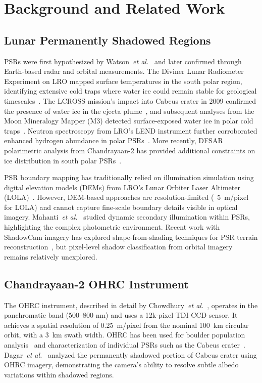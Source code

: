 \documentclass[journal]{IEEEtran}
\begin{document}
\section{Background and Related Work}
\label{sec:background}

\subsection{Lunar Permanently Shadowed Regions}

PSRs were first hypothesized by Watson~\textit{et al.}~\cite{Watson1961} and later confirmed through Earth-based radar and orbital measurements. The Diviner Lunar Radiometer Experiment on LRO mapped surface temperatures in the south polar region, identifying extensive cold traps where water ice could remain stable for geological timescales~\cite{Paige2010_Diviner}. The LCROSS mission's impact into Cabeus crater in 2009 confirmed the presence of water ice in the ejecta plume~\cite{Colaprete2010_LCROSS}, and subsequent analyses from the Moon Mineralogy Mapper (M3) detected surface-exposed water ice in polar cold traps~\cite{Li2018_WaterIce}. Neutron spectroscopy from LRO's LEND instrument further corroborated enhanced hydrogen abundance in polar PSRs~\cite{Sanin2012_LEND}. More recently, DFSAR polarimetric analysis from Chandrayaan-2 has provided additional constraints on ice distribution in south polar PSRs~\cite{Kumar2022_DFSAR}.

PSR boundary mapping has traditionally relied on illumination simulation using digital elevation models (DEMs) from LRO's Lunar Orbiter Laser Altimeter (LOLA)~\cite{Fassett2026_PSRcraters}. However, DEM-based approaches are resolution-limited (~5~m/pixel for LOLA) and cannot capture fine-scale boundary details visible in optical imagery. Mahanti~\textit{et al.}~\cite{Mahanti2024_SecondaryIllum} studied dynamic secondary illumination within PSRs, highlighting the complex photometric environment. Recent work with ShadowCam imagery has explored shape-from-shading techniques for PSR terrain reconstruction~\cite{Jia2024_SfS_ShadowCam}, but pixel-level shadow classification from orbital imagery remains relatively unexplored.

\subsection{Chandrayaan-2 OHRC Instrument}

The OHRC instrument, described in detail by Chowdhury~\textit{et al.}~\cite{Chowdhury2020_OHRC}, operates in the panchromatic band (500--800 nm) and uses a 12k-pixel TDI CCD sensor. It achieves a spatial resolution of 0.25~m/pixel from the nominal 100~km circular orbit, with a 3~km swath width. OHRC has been used for boulder population analysis~\cite{Dagar2022_Boulders} and characterization of individual PSRs such as the Cabeus crater~\cite{Dagar2023_Cabeus}. Dagar~\textit{et al.}~\cite{Dagar2023_Cabeus} analyzed the permanently shadowed portion of Cabeus crater using OHRC imagery, demonstrating the camera's ability to resolve subtle albedo variations within shadowed regions.
\end{document}
